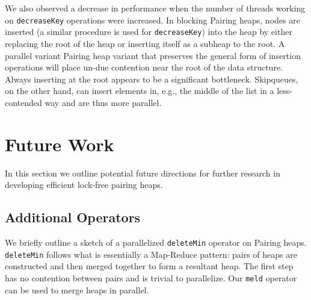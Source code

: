 \documentclass{acm_proc_article-sp}
\begin{document}

We also observed a decrease in performance when the number of threads
working on \texttt{decreaseKey} operations were increased.
In blocking Pairing heaps, nodes are inserted (a similar procedure is used for \texttt{decreaseKey})
into the heap by either replacing the root of the heap or inserting itself as a subheap to the root.
A parallel variant Pairing heap variant that preserves the general form of insertion operations will place un-due contention near the root of the data structure.
Always inserting at the root appears to be a significant bottleneck.
Skipqueues, on the other hand, can insert elements in,
e.g., the middle of the list in a less-contended way
and are thus more parallel.


\section{Future Work}
\label{sec:future}
In this section we
outline potential future directions for further research in developing efficient lock-free pairing heaps.

\subsection{Additional Operators}
We briefly outline a sketch of a parallelized \texttt{deleteMin} operator on Pairing heaps.
\texttt{deleteMin} follows what is essentially a Map-Reduce pattern: pairs of heaps are constructed
and then merged together to form a resultant heap. The first step has no contention between pairs
and is trivial to parallelize. Our \texttt{meld} operator can be used to merge heaps in parallel.
\end{document}
